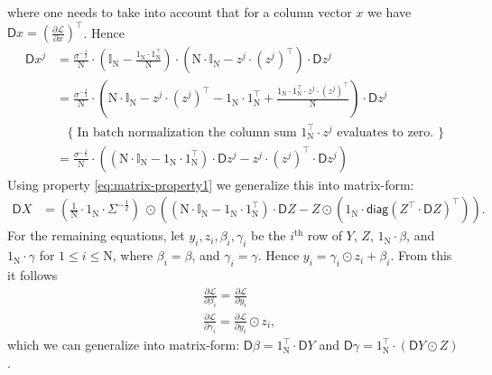 \documentclass[twoside,11pt]{article}
\newcommand{\const}[1]{\ensuremath{\mathrm{#1}}} %
\newcommand{\func}[1]{\ensuremath{\textsf{#1}}} %
\newcommand{\Gradient}{\textsf{D}}
\newcommand{\Derivative}[2]{\ensuremath{\frac{\partial #1}{\partial #2}}}
\begin{document}
where one needs to take into account that for a column vector $x$ we have $\Gradient x = (\Derivative{\mathcal{L}}{x})^\top$.
Hence
\begin{align*}
    \Gradient x^j 
    &=
    \frac{\sigma^{-\frac{1}{2}}}{\const{N}}
    \cdot
    (\mathbb{I}_{\const{N}} - \frac{1_\const{N} \cdot 1_\const{N}^\top}{\const{N}})
    \cdot 
    \left( 
       \const{N} \cdot \mathbb{I}_{\const{N}} - z^j \cdot (z^j)^\top 
    \right)
    \cdot
    \Gradient z^j
    \\
    &=
    \frac{\sigma^{-\frac{1}{2}}}{\const{N}}
    \cdot
    (
      \const{N} \cdot \mathbb{I}_{\const{N}}
      - z^j \cdot (z^j)^\top
      - 1_\const{N} \cdot 1_\const{N}^\top
      + \frac{1_\const{N} \cdot 1_\const{N}^\top \cdot z^j \cdot (z^j)^\top}{\const{N}}
    )  
    \cdot
    \Gradient z^j
    \\     
      & \ \ \ \  \{ \; \text{In batch normalization the column sum $1_\const{N}^\top \cdot z^j$ evaluates to zero. } \}
    \\ 
    &=
    \frac{\sigma^{-\frac{1}{2}}}{\const{N}}
    \cdot
    (
      (\const{N} \cdot \mathbb{I}_{\const{N}} - 1_\const{N} \cdot 1_\const{N}^\top) \cdot \Gradient z^j
      - z^j \cdot (z^j)^\top \cdot \Gradient z^j
    )  
\end{align*}
Using property \eqref{eq:matrix-property1} we generalize this into matrix-form:
\begin{align} \label{eq:batch-normalization-backpropagation}
\Gradient X
     &= (\frac{1}{\const{N}} \cdot 1_\const{N} \cdot \Sigma^{-\frac{1}{2}}) ~\odot 
      \left(
              (\const{N} \cdot \mathbb{I}_\const{N} - 1_\const{N} \cdot 1_\const{N}^\top) \cdot \Gradient Z
              -
              Z \odot (1_\const{N} \cdot \func{diag}(Z^\top \cdot \Gradient Z)^\top)
       \right).
\end{align}
For the remaining equations, let 
$y_i, z_i, \beta_i, \gamma_i$ be the $i^\text{th}$ row of $Y$, $Z$, $1_\const{N} \cdot \beta$, and $1_\const{N} \cdot \gamma$ for $1 \leq i \leq \const{N}$, where $\beta_i = \beta$, and $\gamma_i = \gamma$. Hence $y_i = \gamma_i \odot z_i + \beta_i$. From this it follows
\begin{align*}
    & \Derivative{\mathcal{L}}{\beta_i} = \Derivative{\mathcal{L}}{y_i}
    \\
    & \Derivative{\mathcal{L}}{\gamma_i} = \Derivative{\mathcal{L}}{y_i} \odot z_i,
\end{align*}
which we can generalize into matrix-form:
$\Gradient \beta = 1_\const{N}^\top \cdot \Gradient Y$ and
$\Gradient \gamma = 1_\const{N}^\top \cdot (\Gradient Y \odot Z)$.
\end{document}

